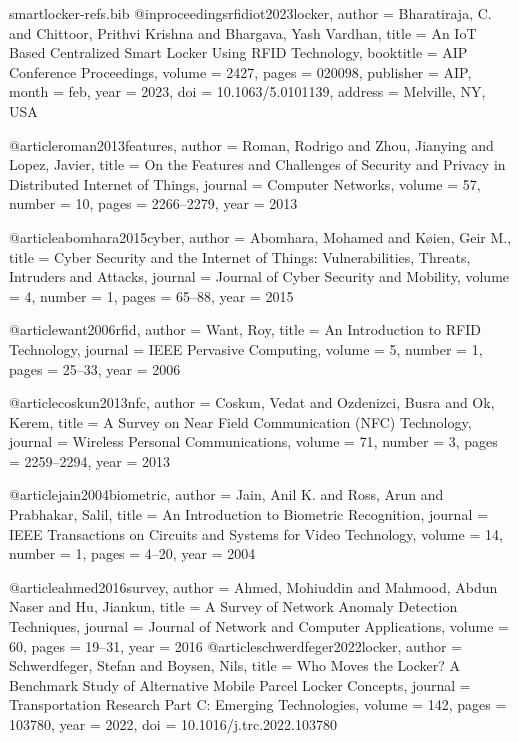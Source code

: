 \begin{filecontents*}[overwrite]{smartlocker-refs.bib}
@inproceedings{rfidiot2023locker,
  author    = {Bharatiraja, C. and Chittoor, Prithvi Krishna and Bhargava, Yash Vardhan},
  title     = {An {IoT} Based Centralized Smart Locker Using {RFID} Technology},
  booktitle = {AIP Conference Proceedings},
  volume    = {2427},
  pages     = {020098},
  publisher = {AIP},
  month     = feb,
  year      = {2023},
  doi       = {10.1063/5.0101139},
  address   = {Melville, NY, USA}
}

@article{roman2013features,
  author  = {Roman, Rodrigo and Zhou, Jianying and Lopez, Javier},
  title   = {On the Features and Challenges of Security and Privacy in Distributed {Internet of Things}},
  journal = {Computer Networks},
  volume  = {57},
  number  = {10},
  pages   = {2266--2279},
  year    = {2013}
}

@article{abomhara2015cyber,
  author  = {Abomhara, Mohamed and K{\o}ien, Geir M.},
  title   = {Cyber Security and the {Internet of Things}: Vulnerabilities, Threats, Intruders and Attacks},
  journal = {Journal of Cyber Security and Mobility},
  volume  = {4},
  number  = {1},
  pages   = {65--88},
  year    = {2015}
}

@article{want2006rfid,
  author  = {Want, Roy},
  title   = {An Introduction to {RFID} Technology},
  journal = {IEEE Pervasive Computing},
  volume  = {5},
  number  = {1},
  pages   = {25--33},
  year    = {2006}
}

@article{coskun2013nfc,
  author  = {Coskun, Vedat and Ozdenizci, Busra and Ok, Kerem},
  title   = {A Survey on Near Field Communication ({NFC}) Technology},
  journal = {Wireless Personal Communications},
  volume  = {71},
  number  = {3},
  pages   = {2259--2294},
  year    = {2013}
}

@article{jain2004biometric,
  author  = {Jain, Anil K. and Ross, Arun and Prabhakar, Salil},
  title   = {An Introduction to Biometric Recognition},
  journal = {IEEE Transactions on Circuits and Systems for Video Technology},
  volume  = {14},
  number  = {1},
  pages   = {4--20},
  year    = {2004}
}

@article{ahmed2016survey,
  author  = {Ahmed, Mohiuddin and Mahmood, Abdun Naser and Hu, Jiankun},
  title   = {A Survey of Network Anomaly Detection Techniques},
  journal = {Journal of Network and Computer Applications},
  volume  = {60},
  pages   = {19--31},
  year    = {2016}
}
@article{schwerdfeger2022locker,
  author  = {Schwerdfeger, Stefan and Boysen, Nils},
  title   = {Who Moves the Locker? {A} Benchmark Study of Alternative Mobile Parcel Locker Concepts},
  journal = {Transportation Research Part C: Emerging Technologies},
  volume  = {142},
  pages   = {103780},
  year    = {2022},
  doi     = {10.1016/j.trc.2022.103780}
}


\end{filecontents*}
